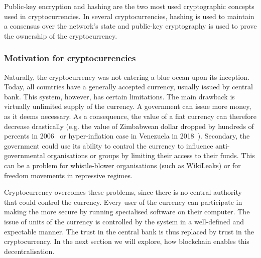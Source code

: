 Public-key encryption and hashing are the two most used cryptographic concepts used in cryptocurrencies. In several cryptocurrencies, hashing is used to maintain a consensus over the network's state and public-key cryptography is used to prove the ownership of the cryptocurrency\footnotemark.
% 

\subsubsection{Motivation for cryptocurrencies}
Naturally, the cryptocurrency was not entering a blue ocean upon its inception. Today, all countries have a generally accepted currency, usually issued by central bank. This system, however, has certain limitations. The main drawback is virtually unlimited supply of the currency. A government can issue more money, as it deems necessary. As a consequence, the value of a fiat currency can therefore decrease drastically (e.g. the value of Zimbabwean dollar dropped by hundreds of percents in 2006~\cite{MichaelWines2006HowZimbabwe} or hyper-inflation case in Venezuela in 2018~\cite{ManuelRueda2018VenezuelasMoney}). Secondary, the government could use its ability to control the currency to influence anti-governmental organisations or groups by limiting their access to their funds. This can be a problem for whistle-blower organisations (such as WikiLeaks) or for freedom movements in repressive regimes.

Cryptocurrency overcomes these problems, since there is no central authority that could control the currency. Every user of the currency can participate in making the more secure by running specialised software on their computer. The issue of units of the currency is controlled by the system in a well-defined and expectable manner. The trust in the central bank is thus replaced by trust in the cryptocurrency. In the next section we will explore, how blockchain enables this decentralisation.